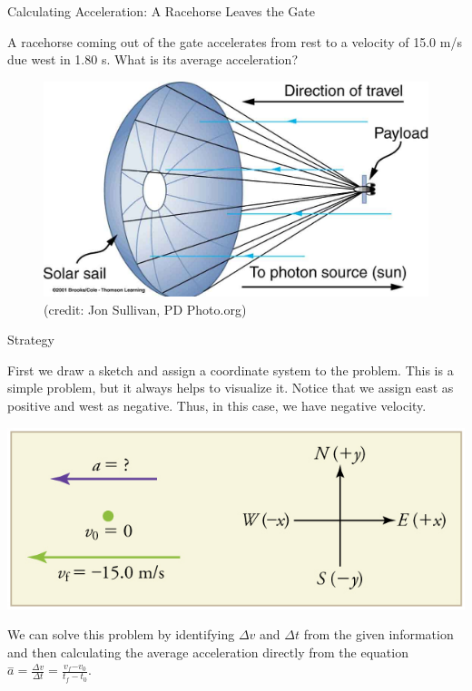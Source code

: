 \documentclass[
]{book}
\newenvironment{tinysection}{}{}
\begin{document}
\hypertarget{fs-id2013623}{}
Calculating Acceleration: A Racehorse Leaves the Gate

A racehorse coming out of the gate accelerates from rest to a velocity
of 15.0 m/s due west in 1.80 s. What is its average acceleration?

\begin{figure}
\hypertarget{import-auto-id1806246}{%
\centering
\includegraphics{images/graphics4.jpg}
\caption{(credit: Jon Sullivan, PD
Photo.org)}\label{import-auto-id1806246}
}
\end{figure}

\begin{tinysection}

{Strategy}

\end{tinysection}

First we draw a sketch and assign a coordinate system to the problem.
This is a simple problem, but it always helps to visualize it. Notice
that we assign east as positive and west as negative. Thus, in this
case, we have negative velocity.

\includegraphics{images/Figure_02_03_01a.jpg}

We can solve this problem by identifying \({\Delta v}{}\) and
\({\Delta t}{}\) from the given information and then calculating the
average acceleration directly from the equation
\({{\overset{-}{a} = \frac{\Delta v}{\Delta t}} = \frac{v_{f}{- v_{0}}}{t_{f} - t_{0}}}{}\).
\end{document}
